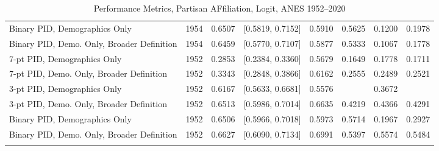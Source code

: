\begin{longtable}{lrrlrrrr}
  Binary PID, Demographics Only & 1954 & 0.6507 & [0.5819, 0.7152] & 0.5910 & 0.5625 & 0.1200 & 0.1978 \\ 
  Binary PID, Demo. Only, Broader Definition & 1954 & 0.6459 & [0.5770, 0.7107] & 0.5877 & 0.5333 & 0.1067 & 0.1778 \\ 
  7-pt PID, Demographics Only & 1952 & 0.2853 & [0.2384, 0.3360] & 0.5679 & 0.1649 & 0.1778 & 0.1711 \\ 
  7-pt PID, Demo. Only, Broader Definition & 1952 & 0.3343 & [0.2848, 0.3866] & 0.6162 & 0.2555 & 0.2489 & 0.2521 \\ 
  3-pt PID, Demographics Only & 1952 & 0.6167 & [0.5633, 0.6681] & 0.5576 &  & 0.3672 &  \\ 
  3-pt PID, Demo. Only, Broader Definition & 1952 & 0.6513 & [0.5986, 0.7014] & 0.6635 & 0.4219 & 0.4366 & 0.4291 \\ 
  Binary PID, Demographics Only & 1952 & 0.6506 & [0.5966, 0.7018] & 0.5973 & 0.5714 & 0.1967 & 0.2927 \\ 
  Binary PID, Demo. Only, Broader Definition & 1952 & 0.6627 & [0.6090, 0.7134] & 0.6991 & 0.5397 & 0.5574 & 0.5484 \\ 
   \bottomrule
\caption{Performance Metrics, Partisan AFfiliation, Logit, ANES 1952--2020} 
\label{tab:ANES_pid_logit}
\end{longtable}
